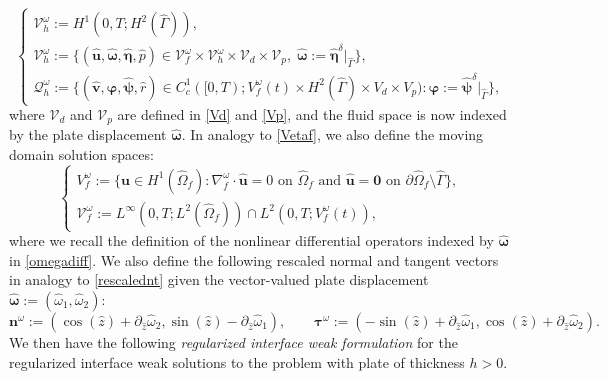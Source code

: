 \documentclass[11pt]{article}
\newcommand{\bd}{\boldsymbol}
\theoremstyle{definition}
\begin{document}
\begin{equation*}
\begin{cases}
\mathcal{V}_h^{\omega} := H^1(0,T;H^2(\hat{\Gamma})),\\
\mathcal{V}_{h}^{\omega} := \{(\hat{\bd{u}}, \hat{\bd{\omega}}, \hat{\bd{\eta}}, \hat{p})\in\mathcal{V}_{f}^{\omega} \times \mathcal{V}_h^{\omega} \times \mathcal{V}_{d} \times \mathcal{V}_{p},\; \hat{\bd{\omega}} := \hat{\bd{\eta}}^{\delta}|_{\hat{\Gamma}}\}, \\
\mathcal{Q}_{h}^{\omega} := \{(\hat{\bd{v}}, \hat{\bd{\varphi}}, \hat{\bd{\psi}}, \hat{r}) \in C_{c}^{1}([0, T); V^{\omega}_{f}(t) \times H^{2}(\hat{\Gamma}) \times V_{d} \times V_{p}) : \hat{\bd{\varphi}} := \hat{\bd{\psi}}^{\delta}|_{\hat{\Gamma}}\},
\end{cases}
\end{equation*}
where $\mathcal{V}_{d}$ and $\mathcal{V}_{p}$ are defined in \eqref{Vd} and \eqref{Vp}, and the fluid space is now indexed by the plate displacement $\hat{\bd{\omega}}$. In analogy to \eqref{Vetaf}, we also define the moving domain solution spaces:
\begin{equation}\label{Vomegaf}
\begin{cases}
V^{\omega}_{f} := \{\bd{u} \in H^{1}(\hat{\Omega}_{f}) : \nabla^{\omega}_{f} \cdot \hat{\bd{u}} = 0 \text{ on } \hat{\Omega}_{f} \text{ and } \hat{\bd{u}} = \bd{0} \text{ on } \partial \hat{\Omega}_{f} \setminus \hat{\Gamma}\}, \\
\mathcal{V}^{\omega}_{f} := L^{\infty}(0, T; L^{2}(\hat{\Omega}_{f})) \cap L^{2}(0, T; V^{\omega}_{f}(t)),
\end{cases}
\end{equation}
where we recall the definition of the nonlinear differential operators indexed by $\hat{\bd{\omega}}$ in \eqref{omegadiff}. We also define the following rescaled normal and tangent vectors in analogy to \eqref{rescalednt} given the vector-valued plate displacement $\hat{\bd{\omega}} := (\hat{\omega}_{1}, \hat{\omega}_{2})$:
\begin{equation}\label{ntomega}
\bd{n}^{\omega} := (\cos(\hat{z}) + \partial_{\hat{z}}\hat{\omega}_{2}, \sin(\hat{z}) - \partial_{\hat{z}}\hat{\omega}_{1}), \qquad \bd{\tau}^{\omega} := (-\sin(\hat{z}) + \partial_{\hat{z}}\hat{\omega}_{1}, \cos(\hat{z}) + \partial_{\hat{z}}\hat{\omega}_{2}).
\end{equation}
We then have the following \textit{regularized interface weak formulation} for the regularized interface weak solutions to the problem with plate of thickness $h > 0$. 
\end{document}

